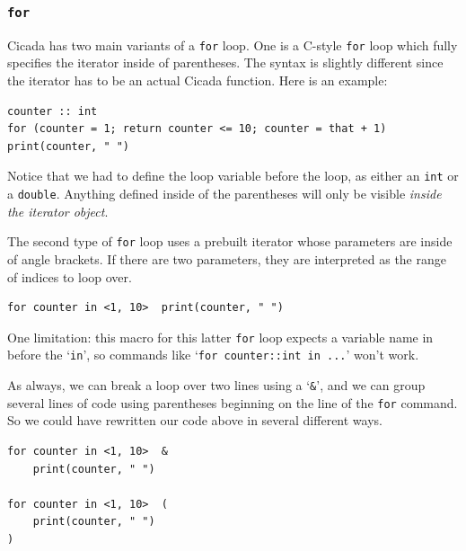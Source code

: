 \documentclass{article}
\newenvironment{code}{
       \begin{list}{}{
               \setlength{\leftmargin}{.4in}
               \setlength{\rightmargin}{0in}
               \setlength{\topsep}{.2in}
       }
       \small
       \item[] }
       { \end{list}   }
\begin{document}



\subsubsection{\texttt{for}} 

Cicada has two main variants of a \texttt{for} loop.  One is a C-style \texttt{for} loop which fully specifies the iterator inside of parentheses.  The syntax is slightly different since the iterator has to be an actual Cicada function.  Here is an example:

\begin{code} \begin{verbatim}
counter :: int
for (counter = 1; return counter <= 10; counter = that + 1)  print(counter, " ")
\end{verbatim} \end{code}

\noindent Notice that we had to define the loop variable before the loop, as either an \verb#int# or a \verb#double#.  Anything defined inside of the parentheses will only be visible \emph{inside the iterator object}.

The second type of \verb#for# loop uses a prebuilt iterator whose parameters are inside of angle brackets.  If there are two parameters, they are interpreted as the range of indices to loop over.

\begin{code} \begin{verbatim}
for counter in <1, 10>  print(counter, " ")
\end{verbatim} \end{code}

\noindent One limitation: this macro for this latter \verb#for# loop expects a variable name in before the `\verb#in#', so commands like `\verb#for counter::int in ...#' won't work.

As always, we can break a loop over two lines using a `\verb#&#', and we can group several lines of code using parentheses beginning on the line of the \verb#for# command.  So we could have rewritten our code above in several different ways.

\begin{code} \begin{verbatim}
for counter in <1, 10>  &
    print(counter, " ")

for counter in <1, 10>  (
    print(counter, " ")
)
\end{verbatim} \end{code}
\end{document}
